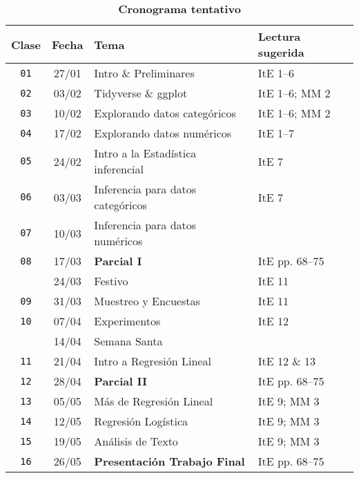 \documentclass[10pt]{article}
\newcommand{\ra}[1]{\renewcommand{\arraystretch}{#1}}
\begin{document}
\begin{table}[htb]
  \centering
  \caption*{\textbf{Cronograma tentativo}}
  \ra{1.5}
  \begin{tabular}{@{\extracolsep{1cm}} c c l l @{}}
    \toprule
    \textbf{Clase} & \textbf{Fecha} & \textbf{Tema} & \textbf{Lectura sugerida}  \\ \toprule
    \texttt{01} & 27/01 & Intro \& Preliminares & ItE 1--6 \\
    \texttt{02} & 03/02 & Tidyverse \& ggplot & ItE 1--6; MM 2 \\
    \texttt{03} & 10/02 & Explorando datos categóricos & ItE 1--6; MM 2 \\
    \texttt{04} & 17/02 & Explorando datos numéricos & ItE 1--7 \\
    \texttt{05} & 24/02 & Intro a la Estadística inferencial & ItE 7 \\
    \texttt{06} & 03/03 & Inferencia para datos categóricos & ItE 7 \\
    \texttt{07} & 10/03 & Inferencia para datos numéricos \\ \midrule
    \texttt{08} & 17/03 & \textbf{Parcial I} & ItE pp. 68--75  \\ \midrule
     & 24/03 & Festivo & ItE 11  \\
    \texttt{09} & 31/03 & Muestreo y Encuestas & ItE 11  \\
    \texttt{10} & 07/04 & Experimentos & ItE 12 \\ 
     & 14/04 & Semana Santa & \\ 
    \texttt{11} & 21/04 & Intro a Regresión Lineal & ItE 12 \& 13 \\ \midrule
    \texttt{12} & 28/04 & \textbf{Parcial II} & ItE pp. 68--75  \\ \midrule
    \texttt{13} & 05/05 & Más de Regresión Lineal & ItE 9; MM 3 \\
    \texttt{14} & 12/05 & Regresión Logística & ItE 9; MM 3 \\
     \texttt{15} & 19/05 & Análisis de Texto & ItE 9; MM 3 \\
    \texttt{16} & 26/05 & \textbf{Presentación Trabajo Final} & ItE pp. 68--75  \\ 
    \bottomrule
  \end{tabular}
\end{table}
\end{document}

